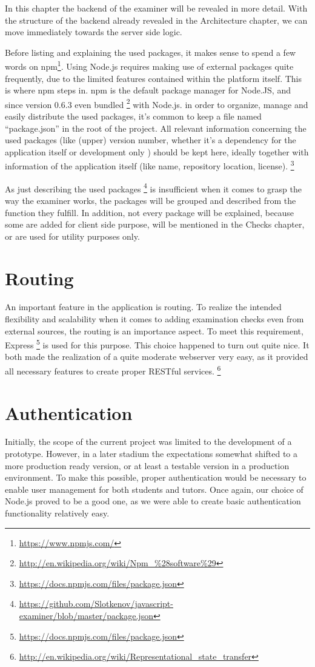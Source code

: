 In this chapter the backend of the \gls{examiner} will be revealed in more 
detail. With the structure of the backend already revealed in the Architecture 
chapter, we can move immediately towards the server side logic.

Before listing and explaining the used packages, it makes sense to spend a few 
words on npm\footnote{\url{https://www.npmjs.com/}}. Using Node.js requires
making use of external packages quite frequently, due to the limited
features contained within the platform itself. This is where npm steps in. npm
is the default package manager for Node.JS, and since version 0.6.3 even bundled
\footnote{\url{http://en.wikipedia.org/wiki/Npm_%28software%29}} with Node.js.
in order to organize, manage and easily distribute the used packages, it's
common to keep a file named ``package.json'' in the root of the project. All 
relevant information concerning the used packages (like (upper) version number,
whether it's a dependency for the application itself or development only
) should be kept here, ideally together with information of the application 
itself (like name, repository location, license).
\footnote{\url{https://docs.npmjs.com/files/package.json}}

As just describing the used packages
\footnote{\url{https://github.com/Slotkenov/javascript-examiner/blob/master/package.json}} is insufficient when it comes to grasp the way the \gls{examiner} works, the 
packages will be grouped and described from the function they fulfill. In
addition, not every package will be explained, because some are added for client
side purpose, will be mentioned in the Checks chapter, or are used for utility
purposes only.

\section{Routing}
An important feature in the application is routing. To realize the intended
flexibility and scalability when it comes to adding examination checks even from
external sources, the routing is an importance aspect. To meet this requirement,
Express \footnote{\url{https://docs.npmjs.com/files/package.json}} is used for
this purpose. This choice happened to turn out quite nice. It both made the
realization of a quite moderate webserver very easy, as it provided all
necessary features to create proper RESTful services.
\footnote{\url{http://en.wikipedia.org/wiki/Representational_state_transfer}}

\section{Authentication}
Initially, the scope of the current project was limited to the development of a
prototype. However, in a later stadium the expectations somewhat shifted to a
more production ready version, or at least a testable version in a production
environment. To make this possible, proper authentication would be necessary to
enable user management for both students and tutors. Once again, our choice of 
Node.js proved to be a good one, as we were able to create basic authentication
functionality relatively easy. 

